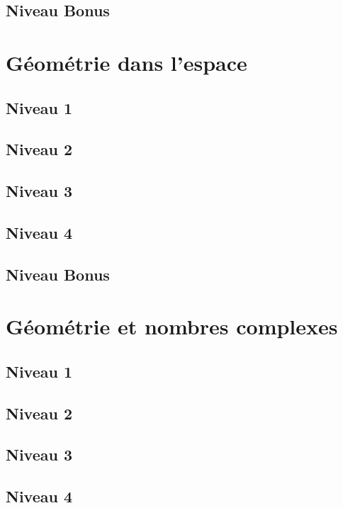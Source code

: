\documentclass[a4paper]{report}
\begin{document}
			\subsection{Niveau Bonus}
	
		\section{Géométrie dans l'espace}
		
			\subsection{Niveau 1}
		
			\subsection{Niveau 2}
		
			\subsection{Niveau 3}
			
			\subsection{Niveau 4}
			
			\subsection{Niveau Bonus}
		
		\section{Géométrie et nombres complexes}
		
			\subsection{Niveau 1}
		
			\subsection{Niveau 2}
		
			\subsection{Niveau 3}
			
			\subsection{Niveau 4}
			
\end{document}
